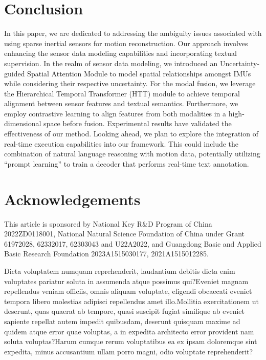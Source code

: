 \documentclass[letterpaper]{article} %
\begin{document}
\section{Conclusion}
In this paper, we are dedicated to addressing the ambiguity issues associated with using sparse inertial sensors for motion reconstruction.
Our approach involves enhancing the sensor data modeling capabilities and incorporating textual supervision. In the realm of sensor data modeling, we introduced an Uncertainty-guided Spatial Attention Module to model spatial relationships amongst IMUs while considering their respective uncertainty. For the modal fusion, we leverage the Hierarchical Temporal Transformer (HTT) module to achieve temporal alignment between sensor features and textual semantics. Furthermore, we employ contrastive learning to align features from both modalities in a high-dimensional space before fusion.
Experimental results have validated the effectiveness of our method.
Looking ahead, we plan to explore the integration of real-time execution capabilities into our framework. This could include the combination of natural language reasoning with motion data, potentially utilizing ``prompt learning'' to train a decoder that performs real-time text annotation.

\section{Acknowledgements}
This article is sponsored by National Key R\&D Program of China 2022ZD0118001, National Natural Science Foundation
of China under Grant 61972028, 62332017, 62303043 and U22A2022, and Guangdong Basic and Applied Basic Research Foundation
2023A1515030177, 2021A1515012285.

Dicta voluptatem numquam reprehenderit, laudantium debitis dicta enim voluptates pariatur soluta in assumenda atque possimus qui?Eveniet magnam repellendus veniam officiis, omnis aliquam voluptate, eligendi obcaecati eveniet tempora libero molestias adipisci repellendus amet illo.Mollitia exercitationem ut deserunt, quas quaerat ab tempore, quasi suscipit fugiat similique ab eveniet sapiente repellat autem impedit quibusdam, deserunt quisquam maxime ad quidem atque error quae voluptas, a in expedita architecto error provident nam soluta voluptas?Harum cumque rerum voluptatibus ea ex ipsam doloremque sint expedita, minus accusantium ullam porro magni, odio voluptate reprehenderit?\clearpage

\end{document}
